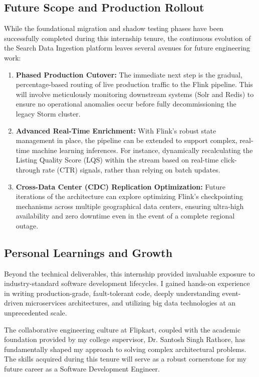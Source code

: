 \subsection{Future Scope and Production Rollout}
\begin{justify}
    While the foundational migration and shadow testing phases have been successfully completed during this internship tenure, the continuous evolution of the Search Data Ingestion platform leaves several avenues for future engineering work:
    
    \begin{enumerate}
        \item \textbf{Phased Production Cutover:} The immediate next step is the gradual, percentage-based routing of live production traffic to the Flink pipeline. This will involve meticulously monitoring downstream systems (Solr and Redis) to ensure no operational anomalies occur before fully decommissioning the legacy Storm cluster.
        \item \textbf{Advanced Real-Time Enrichment:} With Flink's robust state management in place, the pipeline can be extended to support complex, real-time machine learning inferences. For instance, dynamically recalculating the Listing Quality Score (LQS) within the stream based on real-time click-through rate (CTR) signals, rather than relying on batch updates.
        \item \textbf{Cross-Data Center (CDC) Replication Optimization:} Future iterations of the architecture can explore optimizing Flink's checkpointing mechanisms across multiple geographical data centers, ensuring ultra-high availability and zero downtime even in the event of a complete regional outage.
    \end{enumerate}
\end{justify}

\subsection{Personal Learnings and Growth}
\begin{justify}
    Beyond the technical deliverables, this internship provided invaluable exposure to industry-standard software development lifecycles. I gained hands-on experience in writing production-grade, fault-tolerant code, deeply understanding event-driven microservices architectures, and utilizing big data technologies at an unprecedented scale. 

    The collaborative engineering culture at Flipkart, coupled with the academic foundation provided by my college supervisor, Dr. Santosh Singh Rathore, has fundamentally shaped my approach to solving complex architectural problems. The skills acquired during this tenure will serve as a robust cornerstone for my future career as a Software Development Engineer.
\end{justify}